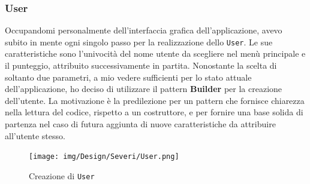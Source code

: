 \documentclass[a4paper,12pt]{report}
\begin{document}
\subsubsection{User}
Occupandomi personalmente dell'interfaccia grafica dell'applicazione, avevo subito in mente ogni singolo passo per la realizzazione dello \texttt{User}. 
Le sue caratteristiche sono l'univocità del nome utente da scegliere nel menù principale e il punteggio, attribuito successivamente in partita. Nonostante la scelta di soltanto due parametri, a mio vedere sufficienti per lo stato attuale dell'applicazione, ho deciso di utilizzare il pattern \textbf{Builder} per la creazione dell'utente. La motivazione è la predilezione per un pattern che fornisce chiarezza nella lettura del codice, rispetto a un costruttore, e per fornire una base solida di partenza nel caso di futura aggiunta di nuove caratteristiche da attribuire all'utente stesso.

\begin{figure}[H]
    \begin{center}
        \centering
        \texttt{[image: img/Design/Severi/User.png]}
    \end{center}
    \caption{Creazione di \texttt{User}}
    \label{img:user}
\end{figure}
\end{document}
